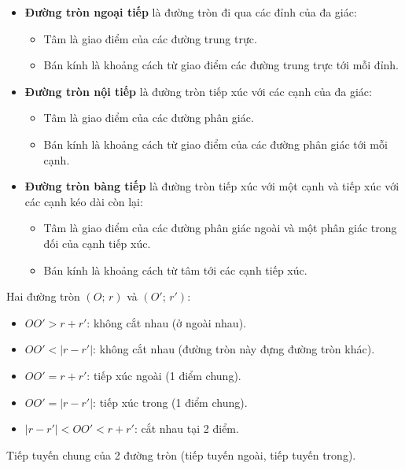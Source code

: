 \documentclass[12pt,a4paper]{article}
\begin{document}
\begin{tinhchat}[title={Đường tròn ngoại tiếp -- nội tiếp -- bàng tiếp}]
  \begin{itemize}
    \item \textbf{Đường tròn ngoại tiếp} là đường tròn đi qua các đỉnh của đa giác:
    \begin{itemize}
      \item Tâm là giao điểm của các đường trung trực.
      \item Bán kính là khoảng cách từ giao điểm các đường trung trực tới mỗi đỉnh.
    \end{itemize}

    \item \textbf{Đường tròn nội tiếp} là đường tròn tiếp xúc với các cạnh của đa giác:
    \begin{itemize}
      \item Tâm là giao điểm của các đường phân giác.
      \item Bán kính là khoảng cách từ giao điểm của các đường phân giác tới mỗi cạnh.
    \end{itemize}

    \item \textbf{Đường tròn bàng tiếp} là đường tròn tiếp xúc với một cạnh và tiếp xúc với các cạnh kéo dài còn lại:
    \begin{itemize}
      \item Tâm là giao điểm của các đường phân giác ngoài và một phân giác trong đối của cạnh tiếp xúc.
      \item Bán kính là khoảng cách từ tâm tới các cạnh tiếp xúc.
    \end{itemize}
  \end{itemize}
\end{tinhchat}

\begin{tinhchat}[title={Vị trí tương đối của hai đường tròn}]
  Hai đường tròn $(O;\, r)$ và $(O';\, r')$:
  \begin{itemize}
    \item $OO' > r + r'$: không cắt nhau (ở ngoài nhau).
    \item $OO' < |r - r'|$: không cắt nhau (đường tròn này đựng đường tròn khác).
    \item $OO' = r + r'$: tiếp xúc ngoài (1 điểm chung).
    \item $OO' = |r - r'|$: tiếp xúc trong (1 điểm chung).
    \item $|r - r'| < OO' < r + r'$: cắt nhau tại 2 điểm.
  \end{itemize}
  Tiếp tuyến chung của 2 đường tròn (tiếp tuyến ngoài, tiếp tuyến trong).
\end{tinhchat}
\end{document}
